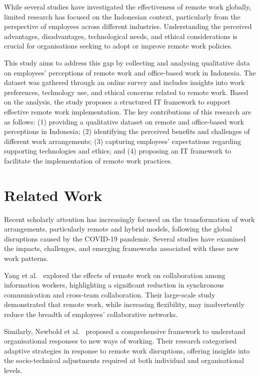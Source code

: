 \documentclass[a4paper, conference]{IEEEtran}
\begin{document}
While several studies have investigated the effectiveness of remote work globally, limited research has focused on the Indonesian context, particularly from the perspective of employees across different industries. Understanding the perceived advantages, disadvantages, technological needs, and ethical considerations is crucial for organisations seeking to adopt or improve remote work policies.

This study aims to address this gap by collecting and analysing qualitative data on employees' perceptions of remote work and office-based work in Indonesia. The dataset was gathered through an online survey and includes insights into work preferences, technology use, and ethical concerns related to remote work. Based on the analysis, the study proposes a structured IT framework to support effective remote work implementation. The key contributions of this research are as follows: (1) providing a qualitative dataset on remote and office-based work perceptions in Indonesia; (2) identifying the perceived benefits and challenges of different work arrangements; (3) capturing employees' expectations regarding supporting technologies and ethics; and (4) proposing an IT framework to facilitate the implementation of remote work practices.

\section{Related Work}

Recent scholarly attention has increasingly focused on the transformation of work arrangements, particularly remote and hybrid models, following the global disruptions caused by the COVID-19 pandemic. Several studies have examined the impacts, challenges, and emerging frameworks associated with these new work patterns.

Yang et al.~\cite{yang2022effects} explored the effects of remote work on collaboration among information workers, highlighting a significant reduction in synchronous communication and cross-team collaboration. Their large-scale study demonstrated that remote work, while increasing flexibility, may inadvertently reduce the breadth of employees’ collaborative networks.

Similarly, Newbold et al.~\cite{Newbold2022NewNormals} proposed a comprehensive framework to understand organisational responses to new ways of working. Their research categorised adaptive strategies in response to remote work disruptions, offering insights into the socio-technical adjustments required at both individual and organisational levels.
\end{document}
